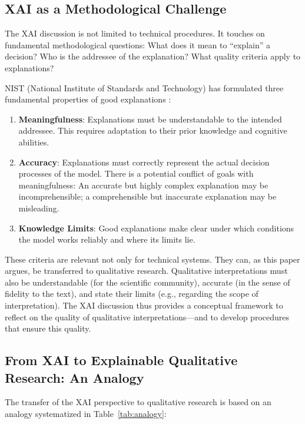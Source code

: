 \documentclass[
  12pt,
  a4paper,
  oneside,
  titlepage
]{article}
\begin{document}
\subsection{XAI as a Methodological Challenge}

The XAI discussion is not limited to technical procedures. It touches on fundamental 
methodological questions: What does it mean to \enquote{explain} a decision? Who is 
the addressee of the explanation? What quality criteria apply to explanations?

NIST (National Institute of Standards and Technology) has formulated three fundamental 
properties of good explanations \citep[ p.~80810]{Ortigossa2024}:

\begin{enumerate}
    \item \textbf{Meaningfulness}: Explanations must be understandable to the intended 
    addressee. This requires adaptation to their prior knowledge and cognitive abilities.
    
    \item \textbf{Accuracy}: Explanations must correctly represent the actual decision 
    processes of the model. There is a potential conflict of goals with meaningfulness: 
    An accurate but highly complex explanation may be incomprehensible; a comprehensible 
    but inaccurate explanation may be misleading.
    
    \item \textbf{Knowledge Limits}: Good explanations make clear under which conditions 
    the model works reliably and where its limits lie.
\end{enumerate}

These criteria are relevant not only for technical systems. They can, as this paper 
argues, be transferred to qualitative research. Qualitative interpretations must also 
be understandable (for the scientific community), accurate (in the sense of fidelity 
to the text), and state their limits (e.g., regarding the scope of interpretation). 
The XAI discussion thus provides a conceptual framework to reflect on the quality of 
qualitative interpretations—and to develop procedures that ensure this quality.

\subsection{From XAI to Explainable Qualitative Research: An Analogy}

The transfer of the XAI perspective to qualitative research is based on an analogy 
systematized in Table~\ref{tab:analogy}:
\end{document}

